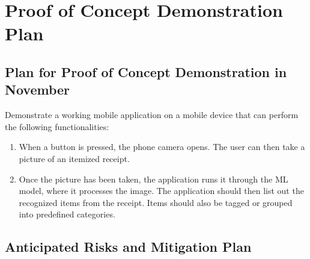 \documentclass{article}
\begin{document}
\section{Proof of Concept Demonstration Plan}

\subsection{Plan for Proof of Concept Demonstration in November}
Demonstrate a working mobile application on a mobile device that can perform the following functionalities:
\begin{enumerate}
    \item When a button is pressed, the phone camera opens. The user can then take a picture of an itemized receipt.
    \item Once the picture has been taken, the application runs it through the ML model, where it processes the image. The application should then list out the recognized items from the receipt. Items should also be tagged or grouped into predefined categories.
\end{enumerate}

\subsection{Anticipated Risks and Mitigation Plan}
\end{document}
